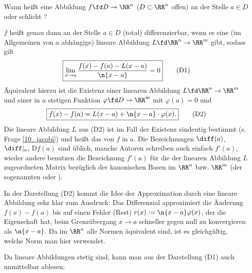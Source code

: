 \begin{frage}\label{10_total}
  Wann heißt eine Abbildung $f \fd D\to \RR^n$ ($D\subset \RR^n$ offen) an der 
  Stelle $a\in D$  oder 
  schlicht ?
\end{frage}

\begin{antwort}
  $f$ heißt genau dann an der Stelle $a\in D$ (total) differenzierbar, wenn 
  es eine (im Allgemeinen von $a$ abhängige) lineare Abbildung 
  $L \fd \RR^n \to \RR^m$ gibt, sodass gilt 
  \begin{equation}\boxed{
      \lim_{x\to a} \frac{f(x)-f(a)-L(x-a)}{ \n{x-a} } =0
    }
    \tag{D1}
  \end{equation}
  Äquivalent hierzu ist die Existenz einer linearen Abbildung 
  $L\fd \RR^n \to \RR^m$ und einer in $a$ stetigen Funktion 
  $\varphi \fd D \to \RR^m$ mit $\varphi(a)=0$ und 
  \begin{equation}\boxed{
      f(x)-f(a)=L(x-a)+ \n{ x-a } \cdot \varphi(x).}
    \tag{D2}
  \end{equation}
  Die lineare Abbildung $L$ aus (D2) ist im Fall der Existenz eindeutig 
  bestimmt (s. Frage \ref{10_jacobi}) 
  und heißt das  von $f$ in $a$. Die 
  Bezeichnungen $\diff (a)$, $\diff |_a$, $\mathrm{D} f(a)$ sind üblich, 
  manche Autoren schreiben auch einfach $f'(a)$, wieder andere benutzen 
  die Bezeichnung $f'(a)$ für die der linearen Abbildung $L$ zugeordneten 
  Matrix bezüglich der kanonischen Basen im $\RR^n$ bzw. $\RR^m$ (der 
  sogenannten  oder ). 

  In der Darstellung (D2) kommt die Idee der Approximation durch eine 
  lineare Abbildung sehr klar zum Ausdruck: Das Differenzial approximiert die 
  Änderung $f(x)-f(a)$ bis auf einen Fehler (Rest) 
  $r(x) := \n{ x-a } \varphi(x)$, der die Eigenschaft hat, beim 
  Grenzübergang $x\to a$ schneller gegen null zu konvergieren als $\n{x-a}$. 
  Da im $\RR^n$ alle Normen äquivalent sind, ist es gleichgültig, welche 
  Norm man hier verwendet.

  Da lineare Abbildungen stetig sind, kann man aus 
  der Darstellung (D1) auch unmittelbar ablesen:

  \medskip\noindent
  \AntEnd
\end{antwort}


